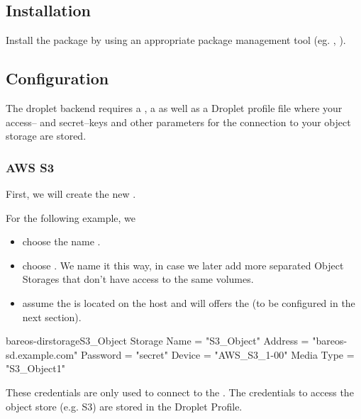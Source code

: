 \subsection{Installation}

Install the package 
by using an appropriate package management tool
(eg. , ).





\subsection{Configuration}
The droplet backend requires a \bareosDir {}, a \bareosSd {} as well as a Droplet profile file where your access-- and secret--keys and other parameters for the connection to your object storage are stored.

\subsubsection{AWS S3}
\label{sec:DropletAwsS3}


First, we will create the new \bareosDir {}.

For the following example, we
\begin{itemize}
  \item choose the name .
  \item choose . We name it this way, in case we later add more separated Object Storages that don't have access to the same volumes.
  \item assume the \bareosSd is located on the host  and will offers the   (to be configured in the next section).
\end{itemize}

\begin{bareosConfigResource}{bareos-dir}{storage}{S3\_Object}
Storage {
    Name = "S3_Object"
    Address  = "bareos-sd.example.com"
    Password = "secret"
    Device = "AWS_S3_1-00"
    Media Type = "S3_Object1"
}
\end{bareosConfigResource}

These credentials are only used to connect to the \bareosSd. The credentials to access the object store (e.g. S3) are stored in the \bareosSd Droplet Profile.



